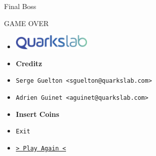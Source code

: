 \documentclass[14pt]{beamer}
\begin{document}
\begin{frame}{Final Boss}
{
        }

    \end{frame}



    \begin{frame}{GAME OVER}

        \begin{itemize}
            \centering
            \item[]\includegraphics[height=2em]{logo.png}
            \item[]\alert{\bf Creditz}
            \item[]\texttt{Serge~Guelton~<sguelton@quarkslab.com>}
            \item[]\texttt{Adrien Guinet <aguinet@quarkslab.com>}
        \end{itemize}
        \begin{itemize}
            \centering
            \item[]\alert{\bf Insert Coins}\vspace{.1em}
            \item[]\texttt{Exit}
            \item[]\texttt{\hyperlink{page.1}{> Play Again <}}
        \end{itemize}

    \end{frame}
\end{document}

